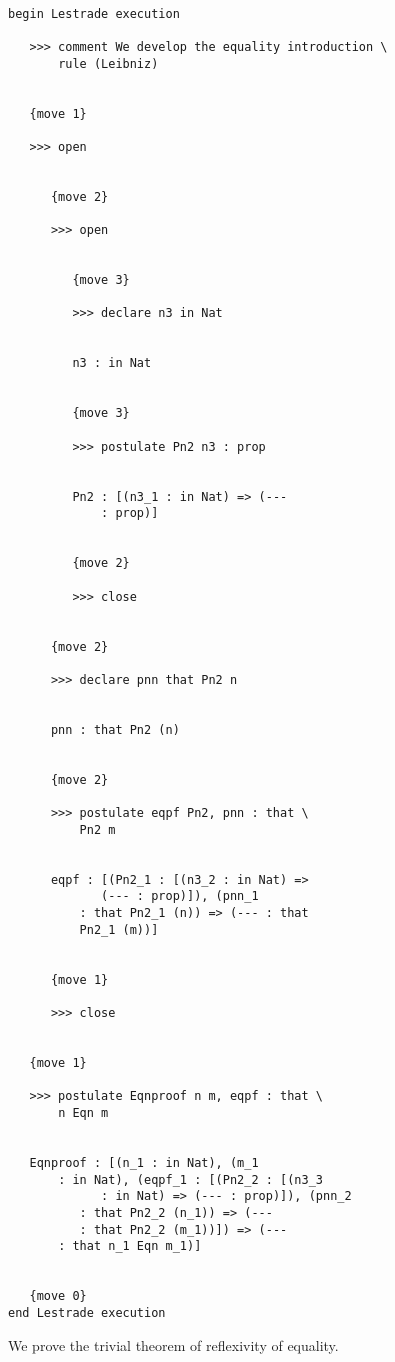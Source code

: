 \documentclass[12pt]{article}
\begin{document}
\begin{verbatim}

begin Lestrade execution

   >>> comment We develop the equality introduction \
       rule (Leibniz)


   {move 1}

   >>> open


      {move 2}

      >>> open


         {move 3}

         >>> declare n3 in Nat


         n3 : in Nat


         {move 3}

         >>> postulate Pn2 n3 : prop


         Pn2 : [(n3_1 : in Nat) => (--- 
             : prop)]


         {move 2}

         >>> close


      {move 2}

      >>> declare pnn that Pn2 n


      pnn : that Pn2 (n)


      {move 2}

      >>> postulate eqpf Pn2, pnn : that \
          Pn2 m


      eqpf : [(Pn2_1 : [(n3_2 : in Nat) => 
             (--- : prop)]), (pnn_1 
          : that Pn2_1 (n)) => (--- : that 
          Pn2_1 (m))]


      {move 1}

      >>> close


   {move 1}

   >>> postulate Eqnproof n m, eqpf : that \
       n Eqn m


   Eqnproof : [(n_1 : in Nat), (m_1 
       : in Nat), (eqpf_1 : [(Pn2_2 : [(n3_3 
             : in Nat) => (--- : prop)]), (pnn_2 
          : that Pn2_2 (n_1)) => (--- 
          : that Pn2_2 (m_1))]) => (--- 
       : that n_1 Eqn m_1)]


   {move 0}
end Lestrade execution
\end{verbatim}

We prove the trivial theorem of reflexivity of equality.
\end{document}
